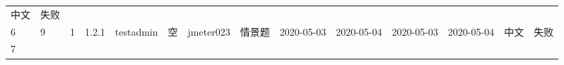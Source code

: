 \documentclass[hyperref, a4paper]{ctexart}
\begin{document}
\begin{longtable}[]{@{}llllllllllllll@{}}
\begin{minipage}[t]{0.04\columnwidth}
中文\strut
\end{minipage} & \begin{minipage}[t]{0.02\columnwidth}\raggedright
失败\strut
\end{minipage}\tabularnewline
\begin{minipage}[t]{0.01\columnwidth}\raggedright
6\strut
\end{minipage} & \begin{minipage}[t]{0.12\columnwidth}\raggedright
9\strut
\end{minipage} & \begin{minipage}[t]{0.03\columnwidth}\raggedright
1\strut
\end{minipage} & \begin{minipage}[t]{0.06\columnwidth}\raggedright
1.2.1\strut
\end{minipage} & \begin{minipage}[t]{0.04\columnwidth}\raggedright
testadmin\strut
\end{minipage} & \begin{minipage}[t]{0.04\columnwidth}\raggedright
空\strut
\end{minipage} & \begin{minipage}[t]{0.04\columnwidth}\raggedright
jmeter023\strut
\end{minipage} & \begin{minipage}[t]{0.02\columnwidth}\raggedright
情景题\strut
\end{minipage} & \begin{minipage}[t]{0.04\columnwidth}\raggedright
2020-05-03\strut
\end{minipage} & \begin{minipage}[t]{0.05\columnwidth}\raggedright
2020-05-04\strut
\end{minipage} & \begin{minipage}[t]{0.07\columnwidth}\raggedright
2020-05-03\strut
\end{minipage} & \begin{minipage}[t]{0.08\columnwidth}\raggedright
2020-05-04\strut
\end{minipage} & \begin{minipage}[t]{0.04\columnwidth}\raggedright
中文\strut
\end{minipage} & \begin{minipage}[t]{0.02\columnwidth}\raggedright
失败\strut
\end{minipage}\tabularnewline
\begin{minipage}[t]{0.01\columnwidth}\raggedright
7\strut
\end{minipage} & \begin{minipage}[t]{0.12\columnwidth}\raggedright

\end{minipage}
\end{longtable}
\end{document}
